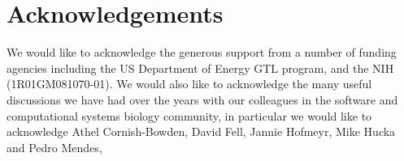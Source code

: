 \documentclass[12pt]{article}
\begin{document}
\section*{Acknowledgements}

We would like to acknowledge the generous support from a number of
funding agencies including the US Department of Energy GTL program,
and the NIH (1R01GM081070-01). We would also like to acknowledge the
many useful discussions we have had over the years with our colleagues in the
software and computational systems biology community, in particular we would like to acknowledge Athel Cornish-Bowden, David Fell, Jannie Hofmeyr, Mike Hucka and Pedro Mendes,


%
%

\end{document}
